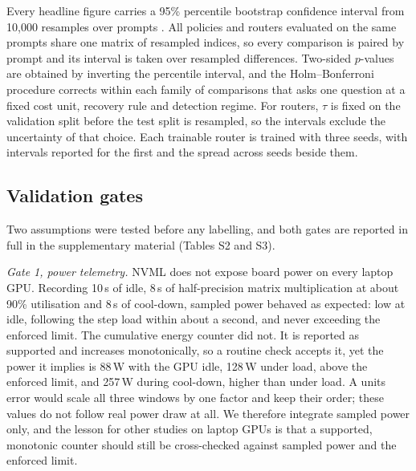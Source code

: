 Every headline figure carries a 95\% percentile bootstrap confidence interval
from 10{,}000 resamples over prompts \cite{efron1993bootstrap}. All policies
and routers evaluated on the same prompts share one matrix of resampled
indices, so every comparison is paired by prompt and its interval is taken
over resampled differences. Two-sided $p$-values are obtained by inverting
the percentile interval, and the Holm--Bonferroni procedure
\cite{holm1979simple} corrects within each family of comparisons that asks
one question at a fixed cost unit, recovery rule and detection regime. For
routers, $\tau$ is fixed on the validation split before the test split is
resampled, so the intervals exclude the uncertainty of that choice. Each
trainable router is trained with three seeds, with intervals reported for the
first and the spread across seeds beside them.

\subsection{Validation gates}
\label{sec:setup-gates}

Two assumptions were tested before any labelling, and both gates are reported
in full in the supplementary material (Tables S2 and S3).

\emph{Gate 1, power telemetry.} NVML does not expose board power on every
laptop GPU. Recording 10\,s of idle, 8\,s of half-precision matrix
multiplication at about 90\% utilisation and 8\,s of cool-down, sampled power
behaved as expected: low at idle, following the step load within about a
second, and never exceeding the enforced limit. The cumulative energy counter
did not. It is reported as supported and increases monotonically, so a
routine check accepts it, yet the power it implies is 88\,W with the GPU
idle, 128\,W under load, above the enforced limit, and 257\,W during
cool-down, higher than under load. A units error would scale all three
windows by one factor and keep their order; these values do not follow real
power draw at all. We therefore integrate sampled power only, and the lesson
for other studies on laptop GPUs is that a supported, monotonic counter
should still be cross-checked against sampled power and the enforced limit.

